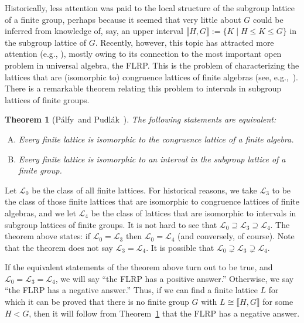 \documentclass{gen-j-l}
\newcommand{\lb}{\ensuremath{\llbracket}}
\newcommand{\rb}{\ensuremath{\rrbracket}}
\newcommand{\<}{\ensuremath{\langle}}
\renewcommand{\>}{\ensuremath{\rangle}}
\theoremstyle{plain}
\newtheorem{theorem}{Theorem}[section]
\theoremstyle{definition}
\theoremstyle{remark}
\numberwithin{theorem}{section}
\numberwithin{claim}{section}
\numberwithin{equation}{section}
\numberwithin{conjecture}{section}
\newcommand{\Palfy}{P\'alfy}
\newcommand{\Pudlak}{Pudl\'ak}
\renewcommand{\leq}{\ensuremath{\leqslant}}
\newcommand{\2}{\ensuremath{\mathbf{2}}}
\newcommand{\3}{\ensuremath{\mathbf{3}}}
\newcommand{\sL}{\ensuremath{\mathscr{L}}}
\begin{document}
Historically, less attention was paid to the local structure of the
subgroup lattice of a finite group, perhaps because it seemed that very little
about $G$ could be inferred from knowledge of, say, an upper
  interval $\lb H,G \rb := \{K \mid H\leq K \leq G\}$ in the subgroup lattice of $G$.
Recently, however, this topic has attracted more attention (e.g.,
\cite{Aschbacher:2009,Basile:2001,Borner:1999,Kohler:1983,Lucchini:1994a,Palfy:1988}),
mostly owing to its connection to the most important open problem in
universal algebra,
the \ac{FLRP}. This is the problem of
characterizing the lattices that are (isomorphic to) congruence lattices of
finite algebras (see, e.g.,~\cite{Berman:1970,DeMeo:thesis,Palfy:1995,Palfy:2001}). 
There is a remarkable theorem relating this problem to intervals in subgroup
lattices of finite groups. 
\begin{theorem}[\Palfy\ and \Pudlak~\cite{Palfy:1980}]
\label{thm:P5}
The following statements are equivalent:
\begin{enumerate}[(A)]
\item Every finite lattice is isomorphic to
  the congruence lattice of a finite algebra.
\item Every finite lattice is isomorphic to
  an interval in the subgroup lattice of a finite group.
\end{enumerate}
\end{theorem}
Let $\sL_0$ be the class of all finite lattices.  For historical reasons, we
take $\sL_3$ to be the class of those finite lattices that are isomorphic
to congruence lattices of finite algebras, and we let $\sL_4$ be the class of
lattices that are isomorphic to intervals in subgroup lattices of finite groups.
It is not hard to see that $\sL_0 \supseteq \sL_3 \supseteq \sL_4$.  The theorem
above states: if $\sL_0 = \sL_3$ then 
$\sL_0= \sL_4$ (and conversely, of course).  Note that the theorem does not say $\sL_3 = \sL_4$.
It is possible that $\sL_0 \supsetneq \sL_3 \supsetneq \sL_4$.

If the equivalent statements of the theorem above turn out to be true, and
$\sL_0=\sL_3=\sL_4$, we will say ``the \acs{FLRP} has a positive answer.''
Otherwise, we say ``the \acs{FLRP} has a negative answer.'' Thus, if we can find a finite lattice $L$ for which it can be
proved that there is no finite group $G$ with $L \cong \lb H,G \rb$ for some $H< G$,
then it will follow from Theorem~\ref{thm:P5} that the \acs{FLRP} has a negative answer.
\end{document}
